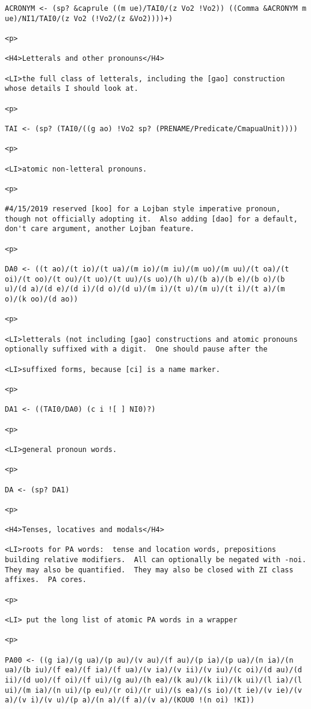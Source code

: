 \documentclass[12pt]{article}
\begin{document}
\begin{lstlisting}
ACRONYM <- (sp? &caprule ((m ue)/TAI0/(z Vo2 !Vo2)) ((Comma &ACRONYM m ue)/NI1/TAI0/(z Vo2 (!Vo2/(z &Vo2))))+)

<p>

<H4>Letterals and other pronouns</H4>

<LI>the full class of letterals, including the [gao] construction whose details I should look at.

<p>

TAI <- (sp? (TAI0/((g ao) !Vo2 sp? (PRENAME/Predicate/CmapuaUnit))))

<p>

<LI>atomic non-letteral pronouns.

<p>

#4/15/2019 reserved [koo] for a Lojban style imperative pronoun, though not officially adopting it.  Also adding [dao] for a default, don't care argument, another Lojban feature.

<p>

DA0 <- ((t ao)/(t io)/(t ua)/(m io)/(m iu)/(m uo)/(m uu)/(t oa)/(t oi)/(t oo)/(t ou)/(t uo)/(t uu)/(s uo)/(h u)/(b a)/(b e)/(b o)/(b u)/(d a)/(d e)/(d i)/(d o)/(d u)/(m i)/(t u)/(m u)/(t i)/(t a)/(m o)/(k oo)/(d ao))

<p>

<LI>letterals (not including [gao] constructions and atomic pronouns optionally suffixed with a digit.  One should pause after the

<LI>suffixed forms, because [ci] is a name marker.

<p>

DA1 <- ((TAI0/DA0) (c i ![ ] NI0)?)

<p>

<LI>general pronoun words.

<p>

DA <- (sp? DA1)

<p>

<H4>Tenses, locatives and modals</H4>

<LI>roots for PA words:  tense and location words, prepositions building relative modifiers.  All can optionally be negated with -noi.  They may also be quantified.  They may also be closed with ZI class affixes.  PA cores.

<p>

<LI> put the long list of atomic PA words in a wrapper

<p>

PA00 <- ((g ia)/(g ua)/(p au)/(v au)/(f au)/(p ia)/(p ua)/(n ia)/(n ua)/(b iu)/(f ea)/(f ia)/(f ua)/(v ia)/(v ii)/(v iu)/(c oi)/(d au)/(d ii)/(d uo)/(f oi)/(f ui)/(g au)/(h ea)/(k au)/(k ii)/(k ui)/(l ia)/(l ui)/(m ia)/(n ui)/(p eu)/(r oi)/(r ui)/(s ea)/(s io)/(t ie)/(v ie)/(v a)/(v i)/(v u)/(p a)/(n a)/(f a)/(v a)/(KOU0 !(n oi) !KI))


\end{lstlisting}
\end{document}
